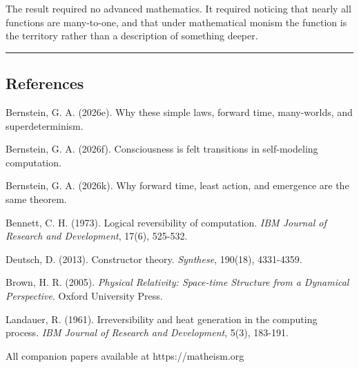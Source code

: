 \documentclass[
]{article}
\begin{document}
The result required no advanced mathematics. It required noticing that
nearly all functions are many-to-one, and that under mathematical monism
the function is the territory rather than a description of something
deeper.

\begin{center}\rule{0.5\linewidth}{0.5pt}\end{center}

\subsection{References}\label{references}

Bernstein, G. A. (2026e). Why these simple laws, forward time,
many-worlds, and superdeterminism.

Bernstein, G. A. (2026f). Consciousness is felt transitions in
self-modeling computation.

Bernstein, G. A. (2026k). Why forward time, least action, and emergence
are the same theorem.

Bennett, C. H. (1973). Logical reversibility of computation. \emph{IBM
Journal of Research and Development}, 17(6), 525-532.

Deutsch, D. (2013). Constructor theory. \emph{Synthese}, 190(18),
4331-4359.

Brown, H. R. (2005). \emph{Physical Relativity: Space-time Structure
from a Dynamical Perspective}. Oxford University Press.

Landauer, R. (1961). Irreversibility and heat generation in the
computing process. \emph{IBM Journal of Research and Development}, 5(3),
183-191.

All companion papers available at https://matheism.org
\end{document}
